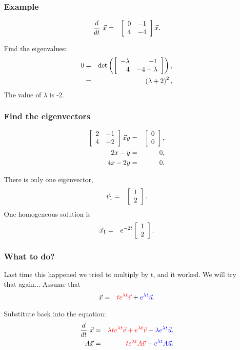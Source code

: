\begin{frame}
  \frametitle{Example}

  \begin{eqnarray*}
    \deriv{~}{t} \vec{x} & = & \arrayTwo{0}{-1}{4}{-4} \vec{x}.
  \end{eqnarray*}

  {
    Find the eigenvalues:
    \begin{eqnarray*}
      0 & = & \det\lp\arrayTwo{-\lambda}{-1}{4}{-4-\lambda}\rp, \\
      & = & \lp \lambda + 2 \rp^2,
    \end{eqnarray*}
    The value of $\lambda$ is -2.
  }

\end{frame}


\begin{frame}
  \frametitle{Find the eigenvectors}

  \begin{eqnarray*}
    \arrayTwo{2}{-1}{4}{-2} \vec{x}{y} & = & \vecTwo{0}{0}, \\
    2x - y & = & 0, \\
    4x - 2y & = & 0.
  \end{eqnarray*}

  There is only one eigenvector,
  \begin{eqnarray*}
    \vec{v}_1 & = & \vecTwo{1}{2}.
  \end{eqnarray*}
  One homogeneous solution is 
  \begin{eqnarray*}
   \vec{x}_1 & = & e^{-2t}\vecTwo{1}{2}.
  \end{eqnarray*}

\end{frame}

\begin{frame}
  \frametitle{What to do?}

  Last time this happened we tried to multiply by $t$, and it
  worked. We will try that again...
  Assume that
  \begin{eqnarray*}
    \vec{x} & = & \redText{t e^{\lambda t} \vec{v}} + \blueText{e^{\lambda t} \vec{u}}.
  \end{eqnarray*}

  {
    Substitute back into the equation:
    \begin{eqnarray*}
      \deriv{~}{t} \vec{x} & = & \redText{\lambda t e^{\lambda t} \vec{v} +  
        e^{\lambda t} \vec{v} }
         + \blueText{\lambda e^{\lambda t} \vec{u}}, \\
      A\vec{x} & = & \redText{t e^{\lambda t} A \vec{v}} + 
                     \blueText{e^{\lambda t} A \vec{u}}.
    \end{eqnarray*}
  }
  
\end{frame}


